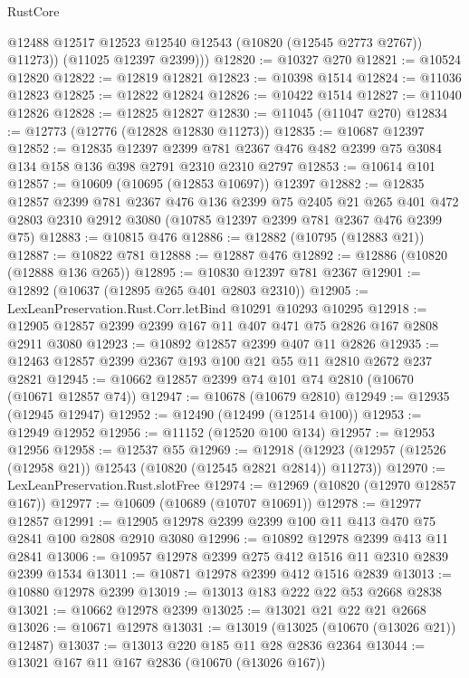 \begin{lexlean}{RustCore}
\begin{coremodule}
            @12488
            @12517
            @12523
            @12540
            @12543
            (@10820 (@12545 @2773 @2767))
            @11273))
        (@11025 @12397 @2399)))
@12820 := @10327 @270
@12821 := @10524 @12820
@12822 := @12819 @12821
@12823 := @10398 @1514
@12824 := @11036 @12823
@12825 := @12822 @12824
@12826 := @10422 @1514
@12827 := @11040 @12826
@12828 := @12825 @12827
@12830 := @11045 (@11047 @270)
@12834 := @12773 (@12776 (@12828 @12830 @11273))
@12835 := @10687 @12397
@12852 := @12835
    @12397
    @2399
    @781
    @2367
    @476
    @482
    @2399
    @75
    @3084
    @134
    @158
    @136
    @398
    @2791
    @2310
    @2310
    @2797
@12853 := @10614 @101
@12857 := @10609 (@10695 (@12853 @10697)) @12397
@12882 := @12835
    @12857
    @2399
    @781
    @2367
    @476
    @136
    @2399
    @75
    @2405
    @21
    @265
    @401
    @472
    @2803
    @2310
    @2912
    @3080
    (@10785 @12397 @2399 @781 @2367 @476 @2399 @75)
@12883 := @10815 @476
@12886 := @12882 (@10795 (@12883 @21))
@12887 := @10822 @781
@12888 := @12887 @476
@12892 := @12886 (@10820 (@12888 @136 @265))
@12895 := @10830 @12397 @781 @2367
@12901 := @12892 (@10637 (@12895 @265 @401 @2803 @2310))
@12905 := LexLeanPreservation.Rust.Corr.letBind @10291 @10293 @10295
@12918 := @12905 @12857 @2399 @2399 @167 @11 @407 @471 @75 @2826 @167 @2808 @2911 @3080
@12923 := @10892 @12857 @2399 @407 @11 @2826
@12935 := @12463 @12857 @2399 @2367 @193 @100 @21 @55 @11 @2810 @2672 @237 @2821
@12945 := @10662 @12857 @2399 @74 @101 @74 @2810 (@10670 (@10671 @12857 @74))
@12947 := @10678 (@10679 @2810)
@12949 := @12935 (@12945 @12947)
@12952 := @12490 (@12499 (@12514 @100))
@12953 := @12949 @12952
@12956 := @11152 (@12520 @100 @134)
@12957 := @12953 @12956
@12958 := @12537 @55
@12969 := @12918 (@12923 (@12957 (@12526 (@12958 @21)) @12543 (@10820 (@12545 @2821 @2814)) @11273))
@12970 := LexLeanPreservation.Rust.slotFree
@12974 := @12969 (@10820 (@12970 @12857 @167))
@12977 := @10609 (@10689 (@10707 @10691))
@12978 := @12977 @12857
@12991 := @12905 @12978 @2399 @2399 @100 @11 @413 @470 @75 @2841 @100 @2808 @2910 @3080
@12996 := @10892 @12978 @2399 @413 @11 @2841
@13006 := @10957 @12978 @2399 @275 @412 @1516 @11 @2310 @2839 @2399 @1534
@13011 := @10871 @12978 @2399 @412 @1516 @2839
@13013 := @10880 @12978 @2399
@13019 := @13013 @183 @222 @22 @53 @2668 @2838
@13021 := @10662 @12978 @2399
@13025 := @13021 @21 @22 @21 @2668
@13026 := @10671 @12978
@13031 := @13019 (@13025 (@10670 (@13026 @21)) @12487)
@13037 := @13013 @220 @185 @11 @28 @2836 @2364
@13044 := @13021 @167 @11 @167 @2836 (@10670 (@13026 @167))

\end{coremodule}
\end{lexlean}
